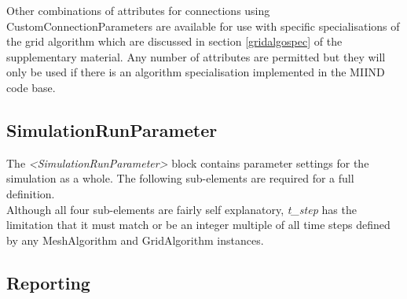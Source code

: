 \documentclass[utf8]{frontiersSCNS} %
\begin{document}
Other combinations of attributes for connections using CustomConnectionParameters are available for use with specific specialisations of the grid algorithm which are discussed in section \ref{gridalgospec} of the supplementary material. Any number of attributes are permitted but they will only be used if there is an algorithm specialisation implemented in the MIIND code base.\\

\subsection{SimulationRunParameter}

The \textit{\textless SimulationRunParameter\textgreater} block contains parameter settings for the simulation as a whole. The following sub-elements are required for a full definition.\\

Although all four sub-elements are fairly self explanatory, \textit{t\_step} has the limitation that it must match or be an integer multiple of all time steps defined by any MeshAlgorithm and GridAlgorithm instances. \\

\subsection{Reporting}
\end{document}
